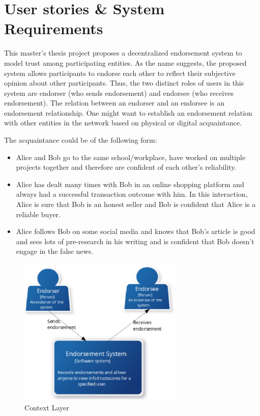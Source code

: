 \section{User stories \& System Requirements} \label{ch:UserStories}
This master's thesis project proposes a decentralized endorsement system to
model trust among participating entities. As the name suggests, the proposed
system allows participants to endorse each other to reflect their subjective
opinion about other participants. Thus, the two distinct roles of users in this
system are endorser (who sends endorsement) and endorsee (who receives
endorsement). The relation between an endorser and an endorsee is an
endorsement relationship. One might want to establish an endorsement relation
with other entities in the network based on physical or digital acquaintance. \par
The acquaintance could be of the following form: 
\begin{itemize}
	\item Alice and Bob go to the same school/workplace, have worked on
		multiple projects together and therefore are confident of each other's
		reliability.
	\item Alice has dealt many times with Bob in an online shopping platform
		and always had a successful transaction outcome with him. In this
		interaction, Alice is sure that Bob is an honest seller and Bob is
		confident that Alice is a reliable buyer.
	\item Alice follows Bob on some social media and knows that Bob's article
		is good and sees lots of pre-research in his writing and is confident
		that Bob doesn't engage in the false news. 
\end{itemize}
\begin{figure}
	\centering
	\includegraphics[width=0.7\textwidth]{Images/ContextLayer.eps}
	\caption{Context Layer}
	\label{fig:context}
\end{figure}
